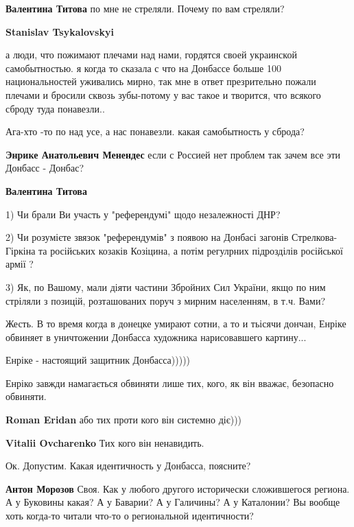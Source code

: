 \begin{itemize}
\begin{itemize}
\textbf{Валентина Титова} по мне не стреляли. Почему по вам стреляли?

\textbf{Stanislav Tsykalovskyi} 

а люди, что пожимают плечами над нами, гордятся своей украинской
самобытностью. я когда то сказала с что на Донбассе больше 100 национальностей
уживались мирно, так мне в ответ презрительно пожали плечами и бросили сквозь
зубы-потому у вас такое и творится, что всякого сброду туда понавезли..

Ага-хто -то по над усе, а нас понавезли. какая самобытность у сброда?

\textbf{Энрике Анатольевич Менендес} если с Россией нет проблем так зачем все эти Донбасс - Донбас?

\textbf{Валентина Титова} 

1) Чи брали Ви участь у "референдумі" щодо незалежності ДНР? 

2) Чи розумієте звязок "референдумів" з появою на Донбасі загонів
Стрелкова-Гіркіна та російських козаків Козіцина, а потім регулрних підрозділів
російської армії ? 

3) Як, по Вашому, мали діяти частини Збройних Сил України, якщо по ним стріляли
з позицій, розташованих поруч з мирним населенням, в т.ч.  Вами?

\end{itemize} %


Жесть. В то время когда в донецке умирают сотни, а то и тьісячи дончан, Енріке
обвиняет в уничтожении Донбасса художника нарисовавшего картину...

Енріке - настоящий защитник Донбасса)))))

\begin{itemize} %
Енріко завжди намагається обвиняти лише тих, кого, як він вважає, безопасно обвиняти.

\textbf{Roman Eridan} або тих проти кого він системно діє)))

\textbf{Vitalii Ovcharenko} Тих кого він ненавидить.
\end{itemize} %

Ок. Допустим.
Какая идентичность у Донбасса, поясните?

\begin{itemize} %
\textbf{Антон Морозов} Своя. Как у любого другого исторически сложившегося региона. А у Буковины какая? А у Баварии? А у Галичины? А у Каталонии?
Вы вообще хоть когда-то читали что-то о региональной идентичности?


\end{itemize}
\end{itemize}
